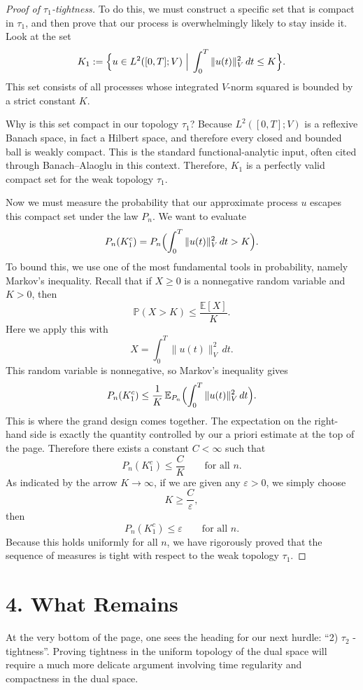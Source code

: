 \documentclass[11pt]{article}
\theoremstyle{definition}
\theoremstyle{remark}
\begin{document}
\begin{proof}[Proof of $\tau_1$-tightness]
To do this, we must construct a specific set that is compact in $\tau_1$, and then prove that our process is overwhelmingly likely to stay inside it. Look at the set
\[
  K_1:=\Bigl\{
  u\in L^2([0,T];V)\; \Big|\;
  \int_0^T \|u(t)\|_V^2\,dt\le K
  \Bigr\}.
\]
This set consists of all processes whose integrated $V$-norm squared is bounded by a strict constant $K$.

Why is this set compact in our topology $\tau_1$? Because $L^2([0,T];V)$ is a reflexive Banach space, in fact a Hilbert space, and therefore every closed and bounded ball is weakly compact. This is the standard functional-analytic input, often cited through Banach--Alaoglu in this context. Therefore, $K_1$ is a perfectly valid compact set for the weak topology $\tau_1$.

Now we must measure the probability that our approximate process $u$ escapes this compact set under the law $P_n$. We want to evaluate
\[
  P_n(K_1^c)
  =
  P_n\Bigl(
  \int_0^T \|u(t)\|_V^2\,dt>K
  \Bigr).
\]
To bound this, we use one of the most fundamental tools in probability, namely Markov's inequality. Recall that if $X\ge 0$ is a nonnegative random variable and $K>0$, then
\[
  \mathbb P(X>K)\le \frac{\mathbb E[X]}{K}.
\]
Here we apply this with
\[
  X=\int_0^T \|u(t)\|_V^2\,dt.
\]
This random variable is nonnegative, so Markov's inequality gives
\[
  P_n(K_1^c)
  \le
  \frac{1}{K}\,
  \mathbb E_{P_n}\Bigl(
  \int_0^T \|u(t)\|_V^2\,dt
  \Bigr).
\]
This is where the grand design comes together. The expectation on the right-hand side is exactly the quantity controlled by our a priori estimate at the top of the page. Therefore there exists a constant $C<\infty$ such that
\[
  P_n(K_1^c)\le \frac{C}{K}
  \qquad \text{for all } n.
\]
As indicated by the arrow $K\to\infty$, if we are given any $\varepsilon>0$, we simply choose
\[
  K\ge \frac{C}{\varepsilon},
\]
then
\[
  P_n(K_1^c)\le \varepsilon
  \qquad \text{for all } n.
\]
Because this holds uniformly for all $n$, we have rigorously proved that the sequence of measures is tight with respect to the weak topology $\tau_1$.
\end{proof}

\section*{4. What Remains}
At the very bottom of the page, one sees the heading for our next hurdle: ``2) $\tau_2$ - tightness''. Proving tightness in the uniform topology of the dual space will require a much more delicate argument involving time regularity and compactness in the dual space.
\end{document}

